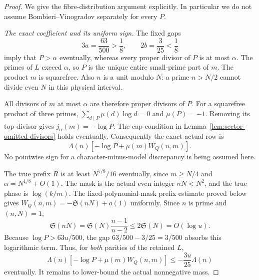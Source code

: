 \documentclass[11pt,a4paper]{article}
\theoremstyle{definition}
\theoremstyle{remark}
\begin{document}
\begin{proof}
We give the fibre-distribution argument explicitly.  In particular
we do not assume Bombieri--Vinogradov separately for every $P$.

\emph{The exact coefficient and its uniform sign.}
The fixed gaps
\[
 3a=\frac{63}{500}>\frac18,\qquad
 2b=\frac3{25}<\frac18
\]
imply that $P>\alpha$ eventually, whereas every proper divisor of
$P$ is at most $\alpha$.  The primes of $L$ exceed $\alpha$, so
$P$ is the unique entire small-prime part of $m$.  The product $m$
is squarefree.  Also $n$ is a unit modulo $N$: a prime $n>N/2$
cannot divide even $N$ in this physical interval.

All divisors of $m$ at most $\alpha$ are therefore proper divisors
of $P$.  For a squarefree product of three primes,
$\sum_{d\mid P}\mu(d)\log d=0$ and $\mu(P)=-1$.  Removing its
top divisor gives $j_\alpha(m)=-\log P$.  The cap condition in
Lemma~\ref{lem:sector-omitted-divisors} holds eventually.  Consequently
the exact actual row is
\begin{equation}
        \Lambda(n)\left[-\log P+\mu(m)W_Q(n,m)\right].
 \label{eq:sector-C-row}
\end{equation}
No pointwise sign for a character-minus-model discrepancy is being
assumed here.

The true prefix $R$ is at least $N^{7/8}/16$ eventually, since
$m\geq N/4$ and $\alpha=N^{1/8}+O(1)$.  The mask is the actual
even integer $nN<N^2$, and the true phase is $\log(k/m)$.
The fixed-polynomial-mask prefix estimate proved below gives
$W_Q(n,m)=-\mathfrak S(nN)+o(1)$ uniformly.  Since $n$ is prime
and $(n,N)=1$,
\[
 \mathfrak S(nN)=\mathfrak S(N)\frac{n-1}{n-2}
                    \leq2\mathfrak S(N)=O(\log u).
\]
Because $\log P>63u/500$, the gap
$63/500-3/25=3/500$ absorbs this logarithmic term.  Thus, for
\emph{both} parities of the retained $L$,
\begin{equation}
 \Lambda(n)\left[-\log P+\mu(m)W_Q(n,m)\right]
                    \leq-\frac{3u}{25}\Lambda(n)
 \label{eq:sector-negative-row}
\end{equation}
eventually.  It remains to lower-bound the actual nonnegative mass.


\end{proof}
\end{document}
